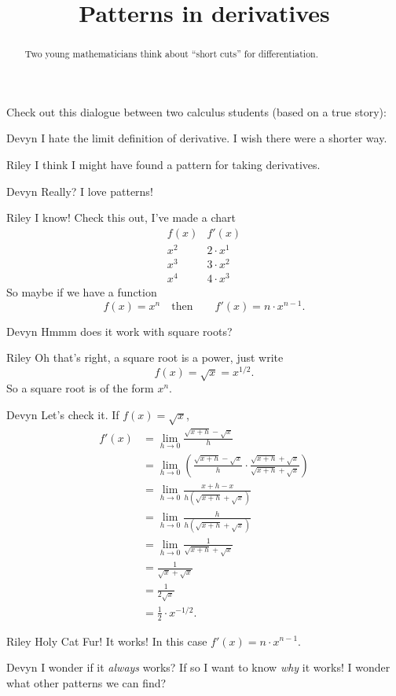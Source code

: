 \documentclass{ximera}
\title[Break-Ground:]{Patterns in derivatives}
\begin{document}
\begin{abstract}
Two young mathematicians think about ``short cuts'' for differentiation.
\end{abstract}
\maketitle

Check out this dialogue between two calculus students (based on a true
story):

\begin{dialogue}
\item[Devyn] I hate the limit definition of derivative.  I wish there
  were a shorter way.
\item[Riley] I think I might have found a pattern for taking
  derivatives.
\item[Devyn] Really? I love patterns!
\item[Riley] I know! Check this out, I've made a chart
{  \renewcommand*{\arraystretch}{1.3}
  \[
  \begin{array}{c|c}
    f(x) & f'(x)\\ \hline
    x^2 & 2\cdot x^1\\
    x^3 & 3\cdot x^2\\
    x^4 & 4\cdot x^3
  \end{array}
  \]
  }
  So maybe if we have a function
  \[
  f(x) = x^n\quad\text{then}\qquad f'(x) = n\cdot x^{n-1}.
  \]
\item[Devyn] Hmmm does it work with square roots?
\item[Riley] Oh that's right, a square root is a power, just write
  \[
  f(x) = \sqrt{x} = x^{1/2}.
  \]
  So a square root is of the form $x^n$.
\item[Devyn] Let's check it. If $f(x) = \sqrt{x}$,
  \begin{align*}
    f'(x) &= \lim_{h\to 0} \frac{\sqrt{x+h} -\sqrt{x}}{h}\\
    &= \lim_{h\to 0} \left(\frac{\sqrt{x+h} - \sqrt{x}}{h}\cdot \frac{\sqrt{x+h} + \sqrt{x}}{\sqrt{x+h} + \sqrt{x}}\right)\\
    &= \lim_{h\to 0} \frac{x+h - x}{h(\sqrt{x+h} + \sqrt{x})}\\
    &= \lim_{h\to 0} \frac{h}{h(\sqrt{x+h} + \sqrt{x})}\\
    &= \lim_{h\to 0} \frac{1}{\sqrt{x+h} + \sqrt{x}}\\
    &= \frac{1}{\sqrt{x} + \sqrt{x}}\\
    &= \frac{1}{2\sqrt{x}}\\
    &= \frac{1}{2}\cdot x^{-1/2}.
  \end{align*}
\item[Riley] Holy Cat Fur! It works! In this case $f'(x) = n\cdot
  x^{n-1}$.
  \item[Devyn] I wonder if it \textit{always} works? If so I want to
    know \textit{why} it works! I wonder what other patterns we can
    find?
\end{dialogue}
\end{document}
